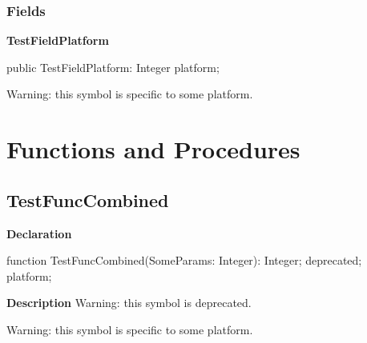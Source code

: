\documentclass{report}
\newif\ifpdf
\begin{document}
 \subsubsection*{\large{\textbf{Fields}}\normalsize\hspace{1ex}\hfill}
\begin{list}{}{
\setlength{\itemindent}{0cm}
\setlength{\listparindent}{0cm}
\setlength{\leftmargin}{\evensidemargin}
\addtolength{\leftmargin}{\tmplength}
\settowidth{\labelsep}{X}
\addtolength{\leftmargin}{\labelsep}
\setlength{\labelwidth}{\tmplength}
}
\label{ok_hint_directives.TTestRecordDeprecated-TestFieldPlatform}
\item[\textbf{TestFieldPlatform}\hfill]
\ifpdf
\begin{flushleft}
\fi
\begin{ttfamily}
public TestFieldPlatform: Integer platform;\end{ttfamily}

\ifpdf
\end{flushleft}
\fi


\par Warning: this symbol is specific to some platform.

 \end{list}
\section{Functions and Procedures}
\ifpdf
\subsection*{\large{\textbf{TestFuncCombined}}\normalsize\hspace{1ex}\hrulefill}
\else
\subsection*{TestFuncCombined}
\fi
\label{ok_hint_directives-TestFuncCombined}
\begin{list}{}{
\setlength{\itemindent}{0cm}
\setlength{\listparindent}{0cm}
\setlength{\leftmargin}{\evensidemargin}
\addtolength{\leftmargin}{\tmplength}
\settowidth{\labelsep}{X}
\addtolength{\leftmargin}{\labelsep}
\setlength{\labelwidth}{\tmplength}
}
\item[\textbf{Declaration}\hfill]
\ifpdf
\begin{flushleft}
\fi
\begin{ttfamily}
function TestFuncCombined(SomeParams: Integer): Integer; deprecated; platform;\end{ttfamily}

\ifpdf
\end{flushleft}
\fi

\par
\item[\textbf{Description}]
Warning: this symbol is deprecated.

Warning: this symbol is specific to some platform.

 

\end{list}
\ifpdf
\end{document}
